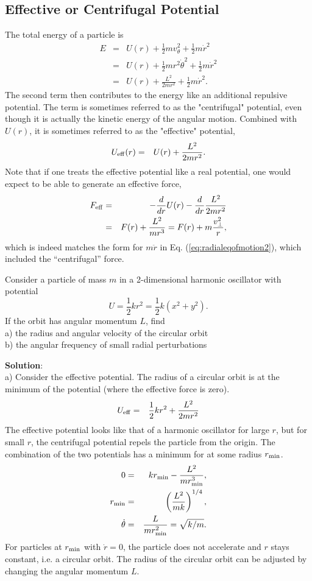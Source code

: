\subsection{Effective or Centrifugal Potential}

The total energy of a particle is 
\begin{eqnarray}
E&=&U(r)+\frac{1}{2}mv_\theta^2+\frac{1}{2}m\dot{r}^2\\
\nonumber
&=&U(r)+\frac{1}{2}mr^2\dot{\theta}^2+\frac{1}{2}m\dot{r}^2\\
\nonumber
&=&U(r)+\frac{L^2}{2mr^2}+\frac{1}{2}m\dot{r}^2.
\end{eqnarray}
The second term then contributes to the energy like an additional repulsive potential. The term is sometimes referred to as the "centrifugal" potential, even though it is actually the kinetic energy of the angular motion. Combined with $U(r)$, it is sometimes referred to as the "effective" potential,
\begin{eqnarray}
U_{\rm eff}(r)&=&U(r)+\frac{L^2}{2mr^2}.
\end{eqnarray}
Note that if one treats the effective potential like a real potential, one would expect to be able to generate an effective force,
\begin{eqnarray}
F_{\rm eff}&=&-\frac{d}{dr}U(r) -\frac{d}{dr}\frac{L^2}{2mr^2}\\
\nonumber
&=&F(r)+\frac{L^2}{mr^3}=F(r)+m\frac{v_\perp^2}{r},
\end{eqnarray}
which is indeed matches the form for $m\ddot{r}$ in Eq. (\ref{eq:radialeqofmotion2}), which included the ``centrifugal'' force.

\example
Consider a particle of mass $m$ in a 2-dimensional harmonic oscillator with potential
\[
U=\frac{1}{2}kr^2=\frac{1}{2}k(x^2+y^2).
\]
If the orbit has angular momentum $L$, find\\
a) the radius and angular velocity of the circular orbit\\
b) the angular frequency of small radial perturbations

{\bf Solution}:\\
a) Consider the effective potential. The radius of a circular orbit is at the minimum of the potential (where the effective force is zero).
\begin{eqnarray*}
U_{\rm eff}&=&\frac{1}{2}kr^2+\frac{L^2}{2mr^2}
\end{eqnarray*}
The effective potential looks like that of a harmonic oscillator for large $r$, but for small $r$, the centrifugal potential repels the particle from the origin. The combination of the two potentials has a minimum for at some radius $r_{\rm min}$.
\begin{eqnarray*}
0&=&kr_{\rm min}-\frac{L^2}{mr_{\rm min}^3},\\
r_{\rm min}&=&\left(\frac{L^2}{mk}\right)^{1/4},\\
\dot{\theta}&=&\frac{L}{mr_{\rm min}^2}=\sqrt{k/m}.
\end{eqnarray*}
For particles at $r_{\rm min}$ with $\dot{r}=0$, the particle does not accelerate and $r$ stays constant, i.e. a circular orbit. The radius of the circular orbit can be adjusted by changing the angular momentum $L$.

